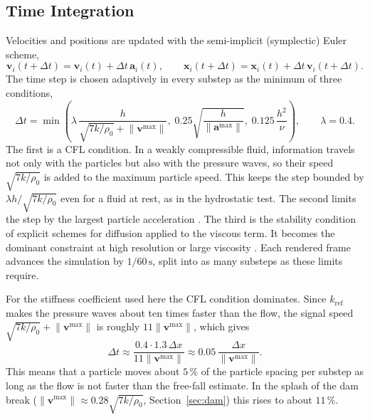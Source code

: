 \subsection{Time Integration}
Velocities and positions are updated with the semi-implicit (symplectic) Euler
scheme,
\begin{equation}
    \boldsymbol{v}_i(t+\Delta t) = \boldsymbol{v}_i(t) + \Delta t\,\boldsymbol{a}_i(t),
    \qquad
    \boldsymbol{x}_i(t+\Delta t) = \boldsymbol{x}_i(t) + \Delta t\,\boldsymbol{v}_i(t+\Delta t).
\end{equation}
The time step is chosen adaptively in every substep as the minimum of three
conditions,
\begin{equation}
    \Delta t = \min\left(
        \lambda\,\frac{h}{\sqrt{7k/\rho_0} + \lVert \boldsymbol{v}^\mathrm{max}\rVert},\;
        0.25\sqrt{\frac{h}{\lVert \boldsymbol{a}^\mathrm{max}\rVert}},\;
        0.125\,\frac{h^2}{\nu}
    \right),
    \qquad \lambda = 0.4.
\end{equation}
The first is a CFL condition. In a weakly compressible fluid, information
travels not only with the particles but also with the pressure waves, so their
speed $\sqrt{7k/\rho_0}$ is added to the maximum particle speed. This keeps the
step bounded by $\lambda h/\sqrt{7k/\rho_0}$ even for a fluid at rest, as in the
hydrostatic test. The second limits the step by the largest particle acceleration
\cite{monaghan1992,morris1997}. The third is the stability condition of
explicit schemes for diffusion applied to the viscous term. It becomes the
dominant constraint at high resolution or large viscosity \cite{morris1997}. Each rendered frame advances the simulation by
$1/60\,\mathrm{s}$, split into as many substeps as these limits require.

For the stiffness coefficient used here the CFL condition dominates. Since $k_\mathrm{ref}$
makes the pressure waves about ten times faster than the flow, the signal speed
$\sqrt{7k/\rho_0} + \lVert \boldsymbol{v}^\mathrm{max}\rVert$ is roughly
$11\lVert \boldsymbol{v}^\mathrm{max}\rVert$, which gives
\begin{equation*}
    \Delta t \approx \frac{0.4 \cdot 1.3\,\Delta x}{11\lVert \boldsymbol{v}^\mathrm{max}\rVert}
    \approx 0.05\,\frac{\Delta x}{\lVert \boldsymbol{v}^\mathrm{max}\rVert}.
\end{equation*}
This means that a particle moves about $5\,\%$ of the particle spacing per
substep as long as the flow is not faster than the free-fall estimate. In the
splash of the dam break ($\lVert \boldsymbol{v}^\mathrm{max}\rVert \approx
0.28\sqrt{7k/\rho_0}$, Section~\ref{sec:dam}) this rises to about $11\,\%$.

